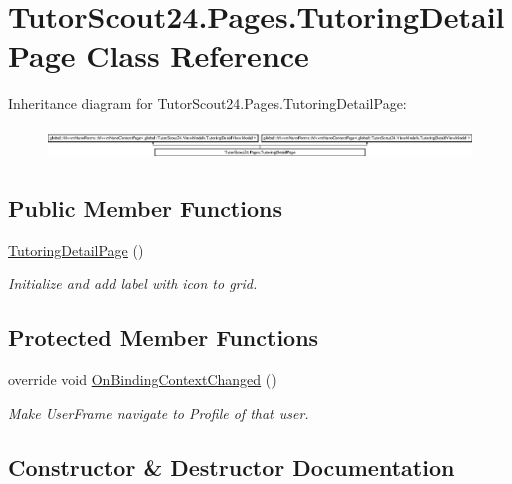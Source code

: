 \hypertarget{class_tutor_scout24_1_1_pages_1_1_tutoring_detail_page}{}\section{Tutor\+Scout24.\+Pages.\+Tutoring\+Detail\+Page Class Reference}
\label{class_tutor_scout24_1_1_pages_1_1_tutoring_detail_page}
Inheritance diagram for Tutor\+Scout24.\+Pages.\+Tutoring\+Detail\+Page\+:\begin{figure}[H]
\begin{center}
\leavevmode
\includegraphics[height=0.851064cm]{class_tutor_scout24_1_1_pages_1_1_tutoring_detail_page}
\end{center}
\end{figure}
\subsection*{Public Member Functions}
\begin{DoxyCompactItemize}
\item 
\mbox{\hyperlink{class_tutor_scout24_1_1_pages_1_1_tutoring_detail_page_a333c004e49f3bb4bc661fceb8adc8efe}{Tutoring\+Detail\+Page}} ()
\begin{DoxyCompactList}\small\item\em Initialize and add label with icon to grid. \end{DoxyCompactList}\end{DoxyCompactItemize}
\subsection*{Protected Member Functions}
\begin{DoxyCompactItemize}
\item 
override void \mbox{\hyperlink{class_tutor_scout24_1_1_pages_1_1_tutoring_detail_page_a8c88fad51bcb6cf222b860c1a3949a5e}{On\+Binding\+Context\+Changed}} ()
\begin{DoxyCompactList}\small\item\em Make User\+Frame navigate to Profile of that user. \end{DoxyCompactList}\end{DoxyCompactItemize}


\subsection{Constructor \& Destructor Documentation}
\mbox{\label{class_tutor_scout24_1_1_pages_1_1_tutoring_detail_page_a333c004e49f3bb4bc661fceb8adc8efe}} 
